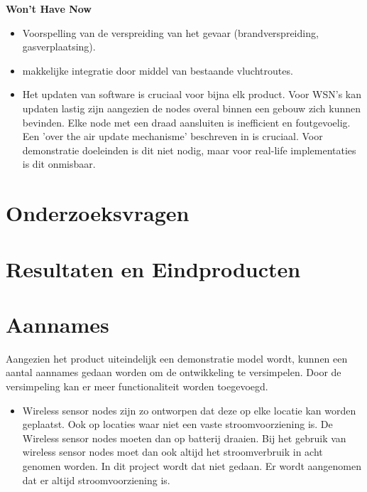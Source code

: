 \documentclass{../local}
\begin{document}
\noindent\textbf{Won't Have Now}
\begin{itemize}
\item Voorspelling van de verspreiding van het gevaar (brandverspreiding, gasverplaatsing).
\item makkelijke integratie door middel van bestaande vluchtroutes.
\item Het updaten van software is cruciaal voor bijna elk product. Voor WSN's kan updaten lastig zijn aangezien de nodes overal binnen een gebouw zich kunnen bevinden. Elke node met een draad aansluiten is inefficient en foutgevoelig. Een 'over the air update mechanisme' beschreven in \cite{StatRUP} is cruciaal. Voor demonstratie doeleinden is dit niet nodig, maar voor real-life implementaties is dit onmisbaar.
\end{itemize}
\section{Onderzoeksvragen}

\section{Resultaten en Eindproducten}

\section{Aannames}
Aangezien het product uiteindelijk een demonstratie model wordt, kunnen een aantal aannames gedaan worden om de ontwikkeling te versimpelen. Door de versimpeling kan er meer functionaliteit worden toegevoegd.

\begin{itemize}
\item Wireless sensor nodes zijn zo ontworpen dat deze op elke locatie kan worden geplaatst. Ook op locaties waar niet een vaste stroomvoorziening is. De Wireless sensor nodes moeten dan op batterij draaien. Bij het gebruik van wireless sensor nodes moet dan ook altijd het stroomverbruik in acht genomen worden. In dit project wordt dat niet gedaan. Er wordt aangenomen dat er altijd stroomvoorziening is.

\end{itemize}
\end{document}
